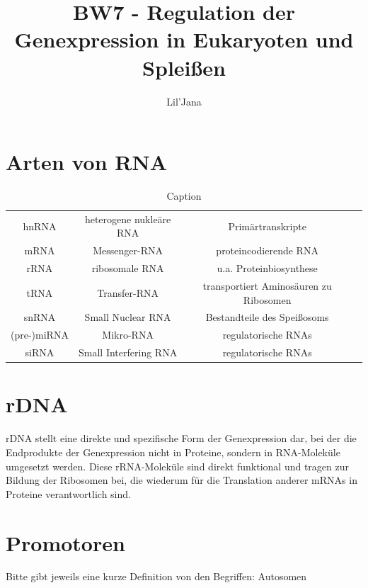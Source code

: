\documentclass{article}
\title{BW7 - Regulation der Genexpression in Eukaryoten und Spleißen}
\author{Lil'Jana}
\begin{document}
\maketitle
\section{Arten von RNA}
\begin{table}[H]
    \centering
    \begin{tabular}{c c c c}
        hnRNA & heterogene nukleäre RNA & Primärtranskripte &  \\
        mRNA &  Messenger-RNA & proteincodierende RNA & \\
        rRNA & ribosomale RNA & u.a. Proteinbiosynthese & \\
        tRNA &  Transfer-RNA & transportiert Aminosäuren zu Ribosomen &  \\
        snRNA & Small Nuclear RNA &  Bestandteile des Speißosoms  & \\
        (pre-)miRNA & Mikro-RNA & regulatorische RNAs  & \\
        siRNA & Small Interfering RNA & regulatorische RNAs  &  \\
    \end{tabular}
    \caption{Caption}
    \label{tab:my_label}
\end{table}

\section{rDNA}
rDNA stellt eine direkte und spezifische Form der Genexpression dar, bei der die Endprodukte der Genexpression nicht in Proteine, sondern in RNA-Moleküle umgesetzt werden. Diese rRNA-Moleküle sind direkt funktional und tragen zur Bildung der Ribosomen bei, die wiederum für die Translation anderer mRNAs in Proteine verantwortlich sind.

\section{Promotoren}








\newpage
Bitte gibt jeweils eine kurze Definition von den Begriffen: 
Autosomen
\end{document}

